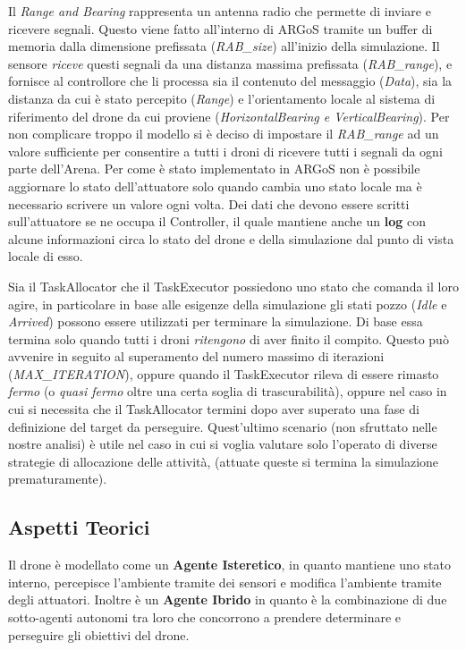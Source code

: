 \documentclass[a4paper,11pt,oneside, table]{article}
\begin{document}
Il \textit{Range and Bearing} rappresenta un antenna radio che permette di inviare e ricevere segnali. Questo viene fatto all'interno di ARGoS tramite un buffer di memoria dalla dimensione prefissata (\textit{RAB\_size}) all'inizio della simulazione.
Il sensore \textit{riceve} questi segnali da una distanza massima prefissata (\textit{RAB\_range}), e fornisce al controllore che li processa sia il contenuto del messaggio (\textit{Data}), sia la distanza da cui \`e stato percepito (\textit{Range}) e l'orientamento locale al sistema di riferimento del drone da cui proviene (\textit{HorizontalBearing e VerticalBearing}).
Per non complicare troppo il modello si \`e deciso di impostare il \textit{RAB\_range} ad un valore sufficiente per consentire a tutti i droni di ricevere tutti i segnali da ogni parte dell'Arena.
Per come \`e stato implementato in ARGoS non \`e possibile aggiornare lo stato dell'attuatore solo quando cambia uno stato locale ma \`e necessario scrivere un valore ogni volta. %
Dei dati che devono essere scritti sull'attuatore se ne occupa il Controller, il quale mantiene anche un \textbf{log} con alcune informazioni circa lo stato del drone e della simulazione dal punto di vista locale di esso.

Sia il TaskAllocator che il TaskExecutor possiedono uno stato che comanda il loro agire, in particolare in base alle esigenze della simulazione gli stati pozzo (\textit{Idle} e \textit{Arrived}) possono essere utilizzati per terminare la simulazione.
Di base essa termina solo quando tutti i droni \textit{ritengono} di aver finito il compito. Questo pu\`o avvenire in seguito al superamento del numero massimo di iterazioni (\textit{MAX\_ITERATION}), oppure quando il TaskExecutor rileva di essere rimasto \textit{fermo} (o \textit{quasi fermo} oltre una certa soglia di trascurabilit\`a), oppure nel caso in cui si necessita che il TaskAllocator termini dopo aver superato una fase di definizione del target da perseguire.
Quest'ultimo scenario (non sfruttato nelle nostre analisi) \`e utile nel caso in cui si voglia valutare solo l'operato di diverse strategie di allocazione delle attivit\`a, (attuate queste si termina la simulazione prematuramente).

\subsection{Aspetti Teorici}

Il drone \`e modellato come un \textbf{Agente Isteretico}, in quanto mantiene uno stato interno, percepisce l'ambiente tramite dei sensori e modifica l'ambiente tramite degli attuatori.
Inoltre \`e un \textbf{Agente Ibrido} in quanto \`e la combinazione di due sotto-agenti autonomi tra loro che concorrono a prendere determinare e perseguire gli obiettivi del drone.
\end{document}
